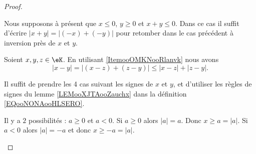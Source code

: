 \begin{proof}
\begin{subproof}
\begin{enumerate}
			      Nous supposons à présent que \( x\leq 0\), \( y\geq 0\) et \( x+y\leq 0\). Dans ce cas il suffit d'écrire \( | x+y |=| (-x)+(-y) |\) pour retomber dans le cas précédent à inversion près de \( x\) et \( y\).
		\end{enumerate}

		Soient \( x,y,z\in \eK\). En utilisant \ref{ItemooOMKNooRlanvk} nous avons
		\begin{equation}
			| x-y |= |  (x-z)+(z-y) |\leq | x-z |+| z-y |.
		\end{equation}

		Il suffit de prendre les 4 cas suivant les signes de \( x\) et \( y\), et d'utiliser les règles de signes du lemme \ref{LEMooXJTAooZauchx} dans la définition \eqref{EQooNONAooHLSERO}.

		Il y a \( 2\) possibilités : \( a\geq 0\) et \( a<0\). Si \( a\geq 0\) alors \( | a |=a\). Donc \( x\geq a=| a |\). Si \( a<0\) alors \( | a |=-a\) et donc \( x\geq -a=| a |\).
	\end{subproof}
\end{proof}
